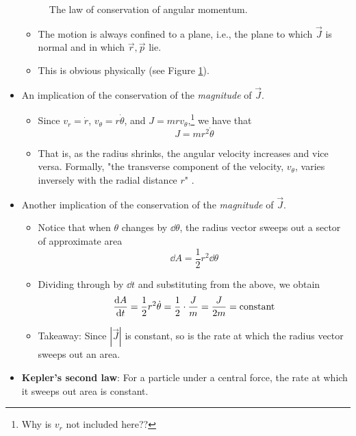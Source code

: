\documentclass[../notes.tex]{subfiles}
\begin{document}
\begin{itemize}
\begin{figure}[h!]
        \caption{The law of conservation of angular momentum.}
        \label{fig:conservAngMtum}
    \end{figure}
    \begin{itemize}
        \item The motion is always confined to a plane, i.e., the plane to which $\vec{J}$ is normal and in which $\vec{r},\vec{p}$ lie.
        \item This is obvious physically (see Figure \ref{fig:conservAngMtum}).
    \end{itemize}
    \item An implication of the conservation of the \emph{magnitude} of $\vec{J}$.
    \begin{itemize}
        \item Since $v_r=\dot{r}$, $v_\theta=r\dot{\theta}$, and $J=mrv_\theta$,\footnote{Why is $v_r$ not included here??} we have that
        \begin{equation*}
            J = mr^2\dot{\theta}
        \end{equation*}
        \item That is, as the radius shrinks, the angular velocity increases and vice versa. Formally, "the transverse component of the velocity, $v_\theta$, varies inversely with the radial distance $r$" \parencite[57]{bib:KibbleBerkshire}.
    \end{itemize}
    \item Another implication of the conservation of the \emph{magnitude} of $\vec{J}$.
    \begin{itemize}
        \item Notice that when $\theta$ changes by $\dd\theta$, the radius vector sweeps out a sector of approximate area
        \begin{equation*}
            \dd{A} = \frac{1}{2}r^2\dd\theta
        \end{equation*}
        \item Dividing through by $\dd{t}$ and substituting from the above, we obtain
        \begin{equation*}
            \dv{A}{t} = \frac{1}{2}r^2\dot{\theta}
            = \frac{1}{2}\cdot\frac{J}{m}
            = \frac{J}{2m}
            = \text{constant}
        \end{equation*}
        \item Takeaway: Since $|\vec{J}|$ is constant, so is the rate at which the radius vector sweeps out an area.
    \end{itemize}
    \item \textbf{Kepler's second law}: For a particle under a central force, the rate at which it sweeps out area is constant.
\end{itemize}
\end{document}
